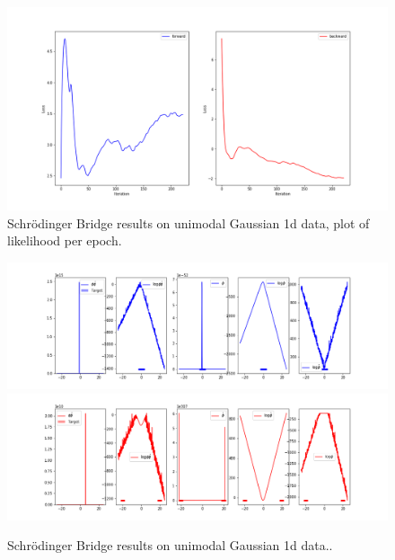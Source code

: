 \documentclass[a4paper,12pt,twoside,openright]{report}
\theoremstyle{definition}
\begin{document}
\begin{figure}
    \centering
    \includegraphics[scale=0.47,trim={2.3cm 1cm 2.5cm 0}, clip]{images/Pavon/pavon convergence big var.png} \vspace{-0.6cm}
    \caption{Schrödinger Bridge results on unimodal Gaussian 1d data, plot of likelihood per epoch. }
    \label{fig:small_to_big_convergence}
\end{figure}
\begin{figure}[t]
    \centering
    \includegraphics[scale=0.42,trim={2.3cm 0.2cm 1.5cm 0}, clip]{images/Pavon/Forward_unimodal_test_working_convex.png} \\\vspace{-0.2cm}
    \includegraphics[scale=0.42,trim={2.3cm 0 1.5cm 1.5cm}, clip]{images/Pavon/Backward_unimodal_test_working_convex.png} 
    \caption{Schrödinger Bridge results on unimodal Gaussian 1d data.. }
    \label{fig:small_delta_collapse}
\end{figure}
\end{document}
